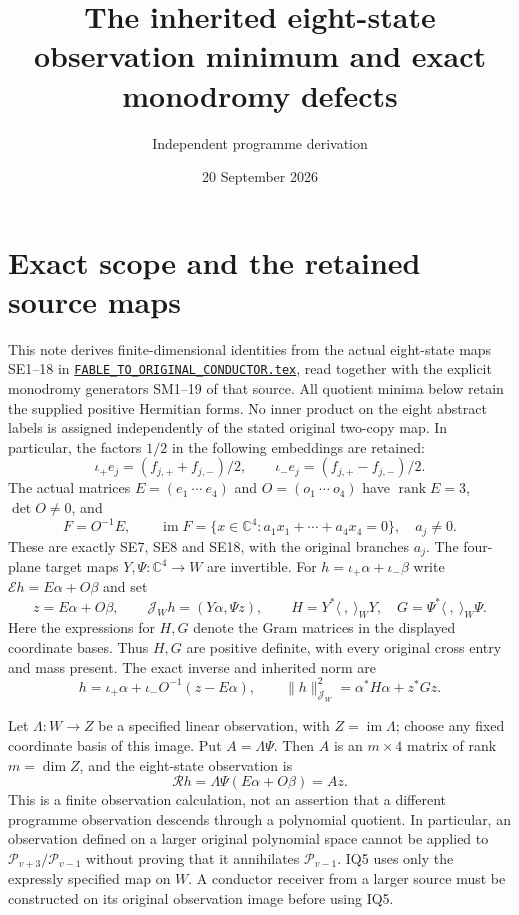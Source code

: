 \documentclass[11pt]{article}
\title{The inherited eight-state observation minimum and exact monodromy defects}
\author{Independent programme derivation}
\date{20 September 2026}
\newcommand{\C}{\mathbb C}
\newcommand{\im}{\operatorname{im}}
\newcommand{\rank}{\operatorname{rank}}
\begin{document}
\maketitle

\section{Exact scope and the retained source maps}
This note derives finite-dimensional identities from the actual eight-state
maps SE1--18 in \href{https://github.com/KokunoYumeto/zeta-function-research-reader/blob/5992ad50c0f2a06921f1fcaded7b4e38097c0739/workbenches/splitzero-tandem/continuations/20260920-original-kernel-mixed-determinants/providers/FABLE_TO_ORIGINAL_CONDUCTOR.tex\#L1}{\texttt{FABLE\_TO\_ORIGINAL\_CONDUCTOR.tex}}, read together
with the explicit monodromy generators SM1--19 of that source.  All quotient
minima below retain the supplied positive Hermitian forms.  No inner product
on the eight abstract labels is assigned independently of the stated original
two-copy map.  In particular, the factors $1/2$ in the following embeddings
are retained:
\[
 \iota_+e_j=(f_{j,+}+f_{j,-})/2,\qquad
 \iota_-e_j=(f_{j,+}-f_{j,-})/2.                       \tag{IQ1}
\]
The actual matrices $E=(e_1\ \cdots\ e_4)$ and $O=(o_1\ \cdots\ o_4)$
have $\rank E=3$, $\det O\ne0$, and
\[
 F=O^{-1}E,\qquad
 \im F=\{x\in\C^4:a_1x_1+\cdots+a_4x_4=0\},\quad a_j\ne0. \tag{IQ2}
\]
These are exactly SE7, SE8 and SE18, with the original branches $a_j$.
The four-plane target maps $Y,\Psi:\C^4\longrightarrow W$ are invertible.
For $h=\iota_+\alpha+\iota_-\beta$ write
$\mathcal E h=E\alpha+O\beta$ and set
\[
 z=E\alpha+O\beta,\qquad
 \mathcal J_W h=(Y\alpha,\Psi z),\qquad
 H=Y^*\langle\ ,\ \rangle_WY,\quad
 G=\Psi^*\langle\ ,\ \rangle_W\Psi.                  \tag{IQ3}
\]
Here the expressions for $H,G$ denote the Gram matrices in the displayed
coordinate bases.  Thus $H,G$ are positive definite, with every original
cross entry and mass present.  The exact inverse and inherited norm are
\[
 h=\iota_+\alpha+\iota_-O^{-1}(z-E\alpha),\qquad
 \|h\|_{\mathcal J_W}^2=\alpha^*H\alpha+z^*Gz.         \tag{IQ4}
\]

Let $\Lambda:W\to Z$ be a specified linear observation, with $Z=\im\Lambda$;
choose any fixed coordinate basis of this image.  Put $A=\Lambda\Psi$.
Then $A$ is an $m\times4$ matrix of rank $m=\dim Z$, and the eight-state
observation is
\[
 \mathcal R h=\Lambda\Psi(E\alpha+O\beta)=Az.          \tag{IQ5}
\]
This is a finite observation calculation, not an assertion that a different
programme observation descends through a polynomial quotient.  In particular,
an observation defined on a larger original polynomial space cannot be applied
to $\mathcal P_{v+3}/\mathcal P_{v-1}$ without proving that it annihilates
$\mathcal P_{v-1}$.  IQ5 uses only the expressly specified map on $W$.  A
conductor receiver from a larger source must be constructed on its original
observation image before using IQ5.
\end{document}
